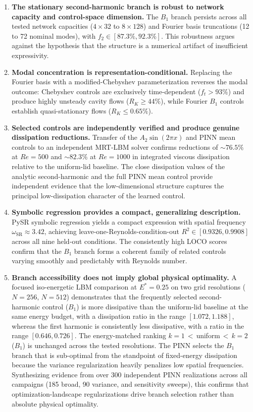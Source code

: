 \documentclass[a4paper,11pt]{article}
\begin{document}
\begin{enumerate}
\item \textbf{The stationary second-harmonic branch is robust to network capacity
and control-space dimension.}
The \(B_1\) branch persists across all tested network capacities (\(4\times32\)
to \(8\times128\)) and Fourier basis truncations (12 to 72 nominal modes),
with \(f_2\in[87.3\%,92.3\%]\). This robustness argues against the hypothesis
that the structure is a numerical artifact of insufficient expressivity.

\item \textbf{Modal concentration is representation-conditional.}
Replacing the Fourier basis with a modified-Chebyshev parameterization reverses
the modal outcome: Chebyshev controls are exclusively time-dependent (\(f_t>93\%\))
and produce highly unsteady cavity flows (\(R_K\ge44\%\)), while Fourier \(B_1\)
controls establish quasi-stationary flows (\(R_K\le0.65\%\)).

\item \textbf{Selected controls are independently verified and produce genuine
dissipation reductions.}
Transfer of the \(A_2\sin(2\pi x)\) and PINN mean controls to an independent
MRT-LBM solver confirms reductions of \(\sim76.5\%\) at \(Re=500\) and
\(\sim82.3\%\) at \(Re=1000\) in integrated viscous dissipation relative to
the uniform-lid baseline. The close dissipation values of the analytic
second-harmonic and the full PINN mean control provide independent evidence
that the low-dimensional structure captures the principal low-dissipation character
of the learned control.

\item \textbf{Symbolic regression provides a compact, generalizing description.}
PySR symbolic regression yields a compact expression with spatial frequency
\(\omega_{\mathrm{SR}}\approx3.42\), achieving leave-one-Reynolds-condition-out
\(R^2\in[0.9326,0.9908]\) across all nine held-out conditions.
The consistently high LOCO scores confirm that the \(B_1\) branch forms a coherent
family of related controls varying smoothly and predictably with Reynolds number.

\item \textbf{Branch accessibility does not imply global physical optimality.}
A focused iso-energetic LBM comparison at \(E^*=0.25\) on two grid resolutions
(\(N=256\), \(N=512\)) demonstrates that the frequently selected
second-harmonic control (\(B_1\)) is more dissipative than the uniform-lid
baseline at the same energy budget, with a dissipation ratio in the range
\([1.072,1.188]\), whereas the first harmonic is consistently less dissipative,
with a ratio in the range \([0.646,0.726]\). The energy-matched ranking
$k=1$\,$<$\,uniform\,$<$\,$k=2$ (\(B_1\)) is unchanged across the tested
resolutions. The PINN selects the \(B_1\) branch that is sub-optimal from the
standpoint of fixed-energy dissipation because the variance regularization
heavily penalizes low spatial frequencies. Synthesizing evidence from over 300
independent PINN realizations across all campaigns (185 broad, 90 variance, and
sensitivity sweeps), this confirms that optimization-landscape regularizations
drive branch selection rather than absolute physical optimality.
\end{enumerate}
\end{document}
